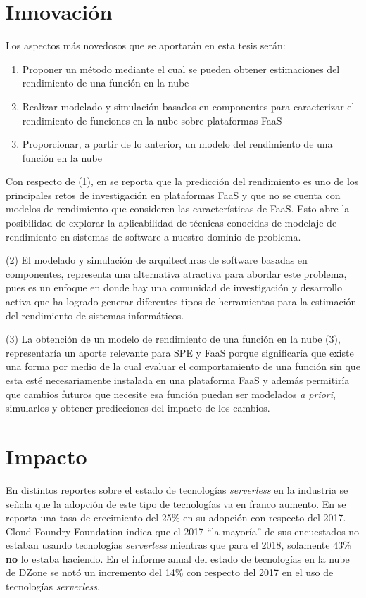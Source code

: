 \section{Innovación}
Los aspectos más novedosos que se aportarán en esta tesis serán:
\begin{enumerate}
    \item Proponer un método mediante el cual se pueden obtener estimaciones del rendimiento de una función en la nube
    \item Realizar modelado y simulación basados en componentes para caracterizar el rendimiento de funciones en la nube sobre plataformas FaaS
    \item Proporcionar, a partir de lo anterior, un modelo del rendimiento de una función en la nube    
\end{enumerate}

Con respecto de (1), en \cite{vanEyk:2018:SRC:3185768.3186308} se reporta que la predicción del rendimiento es uno de los principales retos de investigación en plataformas FaaS y que no se cuenta con modelos de rendimiento que consideren las características de FaaS. Esto abre la posibilidad de explorar la aplicabilidad de técnicas conocidas de modelaje de rendimiento en sistemas de software a nuestro dominio de problema. 

(2) El modelado y simulación de arquitecturas de software basadas en componentes, representa una alternativa atractiva para abordar este problema, pues es un enfoque en donde hay una comunidad de investigación y desarrollo activa que ha logrado generar diferentes tipos de herramientas para la estimación del rendimiento de sistemas informáticos. 

(3) La obtención de un modelo de rendimiento de una función en la nube (3), representaría un aporte relevante para SPE y FaaS porque significaría que existe una forma por medio de la cual evaluar el comportamiento de una función sin que esta esté necesariamente instalada en una plataforma FaaS y además permitiría que cambios futuros que necesite esa función puedan ser modelados \emph{a priori}, simularlos y obtener predicciones del impacto de los cambios.



\section{Impacto}
En distintos reportes sobre el estado de tecnologías \emph{serverless} en la industria \cite{dzone-cloud-2018,rightscale-2018,digital-ocean-2018,pivotal-june-2018} se señala que la adopción de este tipo de tecnologías va en franco aumento. En \cite{rightscale-2018} se reporta una tasa de crecimiento del 25\% en su adopción con respecto del 2017. Cloud Foundry Foundation \cite{pivotal-june-2018} indica que el 2017 ``la mayoría'' de sus encuestados no estaban usando tecnologías \emph{serverless} mientras que para el 2018, solamente 43\% \textbf{no} lo estaba haciendo. En el informe anual del estado de tecnologías en la nube de DZone\cite{dzone-cloud-2018} se notó un incremento del 14\% con respecto del 2017 en el uso de tecnologías \emph{serverless}.

